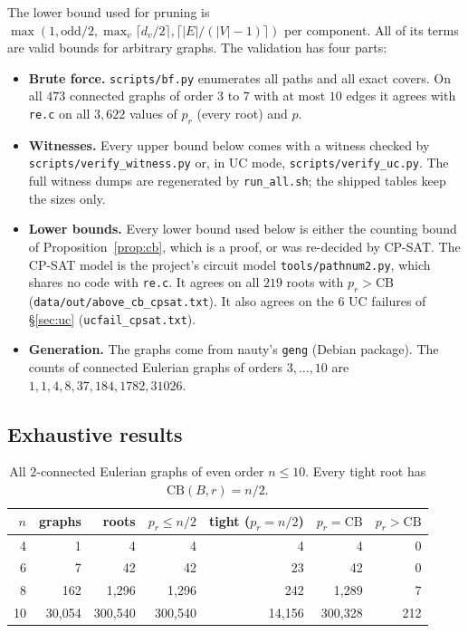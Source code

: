 \documentclass[11pt]{amsart}
\theoremstyle{definition}
\newcommand{\pr}{p_r}
\newcommand{\CB}{\mathrm{CB}}
\begin{document}
The lower bound used for pruning is $\max(1,\mathrm{odd}/2,\max_v\lceil d_v/2\rceil,\lceil
|E|/(|V|-1)\rceil)$ per component. All of its terms are valid bounds for arbitrary graphs.
The validation has four parts:
\begin{itemize}[leftmargin=*]
\item \textbf{Brute force.} \texttt{scripts/bf.py} enumerates all paths and all exact covers. On all
$473$ connected graphs of order $3$ to $7$ with at most $10$ edges it agrees with \texttt{re.c} on all
$3{,}622$ values of $\pr$ (every root) and $p$.
\item \textbf{Witnesses.} Every upper bound below comes with a witness checked by
\texttt{scripts/verify\_witness.py} or, in UC mode, \texttt{scripts/verify\_uc.py}. The full witness dumps
are regenerated by \texttt{run\_all.sh}; the shipped tables keep the sizes only.
\item \textbf{Lower bounds.} Every lower bound used below is either the counting bound of
Proposition~\ref{prop:cb}, which is a proof, or was re-decided by CP-SAT. The CP-SAT model is the
project's circuit model \texttt{tools/pathnum2.py}, which shares no code with \texttt{re.c}. It agrees on
all $219$ roots with $\pr>\CB$ (\texttt{data/out/above\_cb\_cpsat.txt}). It also agrees on the $6$ UC failures
of \S\ref{sec:uc} (\texttt{ucfail\_cpsat.txt}).
\item \textbf{Generation.} The graphs come from nauty's \texttt{geng} (Debian package). The counts of
connected Eulerian graphs of orders $3,\dots,10$ are $1,1,4,8,37,184,1782,31026$.
\end{itemize}

\subsection{Exhaustive results}
\begin{table}[h]
\begin{tabular}{@{}rrrrrrr@{}}
\toprule
$n$ & graphs & roots & $\pr\le n/2$ & tight ($\pr=n/2$) & $\pr=\CB$ & $\pr>\CB$ \\
\midrule
4 & 1 & 4 & 4 & 4 & 4 & 0\\
6 & 7 & 42 & 42 & 23 & 42 & 0\\
8 & 162 & 1{,}296 & 1{,}296 & 242 & 1{,}289 & 7\\
10 & 30{,}054 & 300{,}540 & 300{,}540 & 14{,}156 & 300{,}328 & 212\\
\bottomrule
\end{tabular}
\caption{All $2$-connected Eulerian graphs of even order $n\le10$. Every tight root has
$\CB(B,r)=n/2$.}\label{tab:ex}
\end{table}
\end{document}
